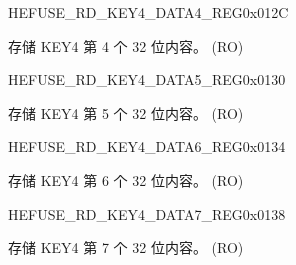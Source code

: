 \begin{register}{H}{EFUSE\_RD\_KEY4\_DATA4\_REG}{0x012C}\label{regdesc:EFUSERDKEY4DATA4REG}
%
\regnewline%
\begin{regdesc}\begin{reglist}
\label{fielddesc:EFUSEKEY4DATA4}\item [EFUSE\_KEY4\_DATA4] 存储 KEY4 第 4 个 32 位内容。 (RO)
\end{reglist}\end{regdesc}
\end{register}


\begin{register}{H}{EFUSE\_RD\_KEY4\_DATA5\_REG}{0x0130}\label{regdesc:EFUSERDKEY4DATA5REG}
%
\regnewline%
\begin{regdesc}\begin{reglist}
\label{fielddesc:EFUSEKEY4DATA5}\item [EFUSE\_KEY4\_DATA5] 存储 KEY4 第 5 个 32 位内容。 (RO)
\end{reglist}\end{regdesc}
\end{register}


\begin{register}{H}{EFUSE\_RD\_KEY4\_DATA6\_REG}{0x0134}\label{regdesc:EFUSERDKEY4DATA6REG}
%
\regnewline%
\begin{regdesc}\begin{reglist}
\label{fielddesc:EFUSEKEY4DATA6}\item [EFUSE\_KEY4\_DATA6] 存储 KEY4 第 6 个 32 位内容。 (RO)
\end{reglist}\end{regdesc}
\end{register}


\begin{register}{H}{EFUSE\_RD\_KEY4\_DATA7\_REG}{0x0138}\label{regdesc:EFUSERDKEY4DATA7REG}
%
\regnewline%
\begin{regdesc}\begin{reglist}
\label{fielddesc:EFUSEKEY4DATA7}\item [EFUSE\_KEY4\_DATA7] 存储 KEY4 第 7 个 32 位内容。 (RO)
\end{reglist}\end{regdesc}
\end{register}


